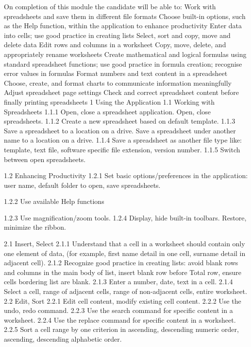 On completion of this module the candidate will be able to:
Work with spreadsheets and save them in different file formats
Choose built-in options, such as the Help function, within the application to enhance productivity
Enter data into cells; use good practice in creating lists
Select, sort and copy, move and delete data
Edit rows and columns in a worksheet
Copy, move, delete, and appropriately rename worksheets
Create mathematical and logical formulas using standard spreadsheet functions; use good practice in formula creation; recognise error values in formulas
Format numbers and text content in a spreadsheet
Choose, create, and format charts to communicate information meaningfully
Adjust spreadsheet page settings
Check and correct spreadsheet content before finally printing spreadsheets
1 Using the Application 
1.1 Working with Spreadsheets 1.1.1 Open, close a spreadsheet 
application. Open, close spreadsheets. 
 1.1.2 Create a new spreadsheet based 
on default template. 
 1.1.3 Save a spreadsheet to a location on a drive. Save a spreadsheet 
under another name to a location on a drive. 
 1.1.4 Save a spreadsheet as another file type like: template, text file, 
software specific file extension, version number. 
 1.1.5 Switch between open spreadsheets. 

1.2 Enhancing Productivity 
1.2.1 Set basic options/preferences in 
the application: user name, default folder to open, save  spreadsheets. 
 
 1.2.2 Use available Help functions

1.2.3 Use magnification/zoom tools. 
 1.2.4 Display, hide built-in toolbars. 
Restore, minimize the ribbon. 



2.1 Insert, Select 2.1.1 Understand that a cell in a 
worksheet should contain only 
one element of data, (for 
example, first name detail in one 
cell, surname detail in adjacent 
cell). 
 2.1.2 Recognize good practice in 
creating lists: avoid blank rows 
and columns in the main body of 
list, insert blank row before Total 
row, ensure cells bordering list 
are blank. 
 2.1.3 Enter a number, date, text in a 
cell. 
 2.1.4 Select a cell, range of adjacent 
cells, range of non-adjacent cells, 
entire worksheet. 
 2.2 Edit, Sort 2.2.1 Edit cell content, modify existing 
cell content. 
 2.2.2 Use the undo, redo command. 
 2.2.3 Use the search command for 
specific content in a worksheet. 
 2.2.4 Use the replace command for 
specific content in a worksheet. 
 2.2.5 Sort a cell range by one criterion 
in ascending, descending 
numeric order, ascending, 
descending alphabetic order. 

